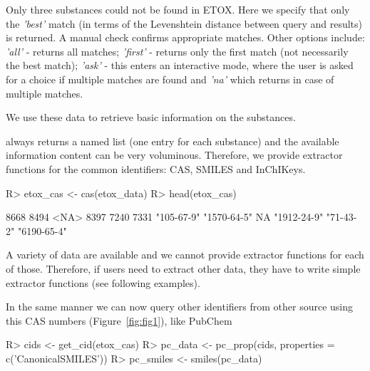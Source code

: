 \documentclass[article, shortnames]{jss}\usepackage[]{graphicx}\usepackage[]{color}
\begin{document}
Only three substances could not be found in ETOX. 
Here we specify that only the \emph{'best'} match (in terms of the Levenshtein distance between query and results) is returned. 
A manual check confirms appropriate matches. 
Other options include: \emph{'all'} - returns all matches; \emph{'first'} - returns only the first match (not necessarily the best match); \emph{'ask'} - this enters an interactive mode, where the user is asked for a choice if multiple matches are found and \emph{'na'} which returns  in case of multiple matches.

We use these data to retrieve basic information on the substances.

\begin{CodeChunk}
\end{CodeChunk}

 always returns a named list (one entry for each substance) and the available information content can be very voluminous.
Therefore, we provide extractor functions for the common identifiers: CAS, SMILES and InChIKeys.
\begin{CodeChunk}
\begin{CodeInput}
R> etox_cas <- cas(etox_data)
R> head(etox_cas)
\end{CodeInput}
\begin{CodeOutput}
       8668        8494        <NA>        8397        7240        7331 
 "105-67-9" "1570-64-5"          NA "1912-24-9"   "71-43-2" "6190-65-4" 
\end{CodeOutput}
\end{CodeChunk}

A variety of data are available and we cannot provide extractor functions for each of those.
Therefore, if users need to extract other data, they have to write simple extractor functions (see following examples).

In the same manner we can now query other identifiers from other source using this CAS numbers (Figure~\ref{fig:fig1}), like PubChem


\begin{CodeChunk}
\begin{CodeInput}
R> cids <- get_cid(etox_cas)
R> pc_data <- pc_prop(cids, properties = c('CanonicalSMILES'))
R> pc_smiles <- smiles(pc_data)
\end{CodeInput}
\end{CodeChunk}
\end{document}
